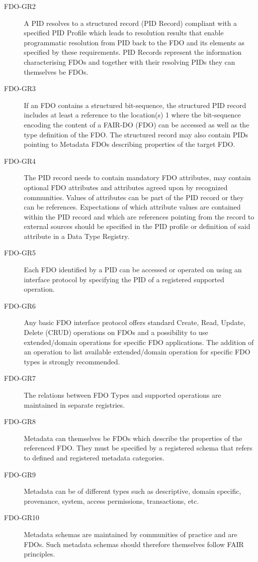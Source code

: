 \begin{description}
\item[FDO-GR2] A PID resolves to a structured record (PID Record) compliant with a specified PID Profile which leads to resolution results that enable programmatic resolution from PID back to the FDO and its elements as specified by these requirements.  PID Records represent the information characterising FDOs and together with their resolving PIDs they can themselves be FDOs.
\item[FDO-GR3] If an FDO contains a structured bit-sequence, the structured PID record includes at least a reference to the location(s) 1 where the bit-sequence encoding the content of a FAIR-DO (FDO) can be accessed as well as the type definition of the FDO.  The structured record may also contain PIDs pointing to Metadata FDOs describing properties of the target FDO. 
\item[FDO-GR4] The PID record needs to contain mandatory FDO attributes, may contain optional FDO attributes and attributes agreed upon by recognized communities.  Values of attributes can be part of the PID record or they can be references.  Expectations of which attribute values are contained within the PID record and which are references pointing from the record to external sources should be specified in the PID profile or definition of said attribute in a Data Type Registry. 
\item[FDO-GR5] Each FDO identified by a PID can be accessed or operated on using an interface protocol by specifying the PID of a registered supported operation. 
\item[FDO-GR6] Any basic FDO interface protocol offers standard Create, Read, Update, Delete (CRUD) operations on FDOs and a possibility to use extended/domain operations for specific FDO applications.  The addition of an operation to list available extended/domain operation for specific FDO types is strongly recommended. 
\item[FDO-GR7] The relations between FDO Types and supported operations are maintained in separate registries. 
\item[FDO-GR8] Metadata can themselves be FDOs which describe the properties of the referenced FDO.  They must be specified by a registered schema that refers to defined and registered metadata categories. 
\item[FDO-GR9] Metadata can be of different types such as descriptive, domain specific, provenance, system, access permissions, transactions, etc. 
\item[FDO-GR10] Metadata schemas are maintained by communities of practice and are FDOs.  Such metadata schemas should therefore themselves follow FAIR principles. 

\end{description}
